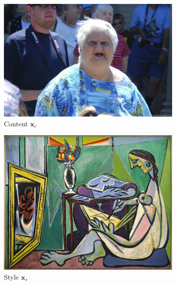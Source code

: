 \documentclass[10pt]{beamer}
\begin{document}
\begin{frame}
\begin{figure}
    \centering
    \begin{subfigure}[b]{0.3\textwidth}
        \includegraphics[width=\textwidth]{images/granny.jpg}
        \caption{Content $\bm x_c$}
    \end{subfigure}
    \begin{subfigure}[b]{0.3\textwidth}
        \includegraphics[width=\textwidth]{images/la-muse.jpg}
        \caption{Style $\bm x_s$}
        \vspace{-0.6cm}
    \end{subfigure}
    \begin{subfigure}[b]{0.3\textwidth}

\end{subfigure}
\end{figure}
\end{frame}
\end{document}
